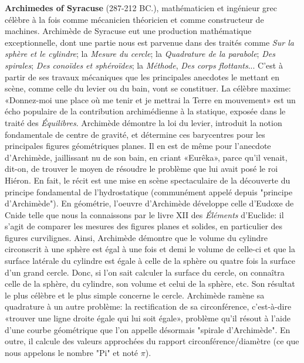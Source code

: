 \pichskip{15pt}%
\textbf{Archimedes of Syracuse} (287-212 BC.), mathématicien et ingénieur grec célèbre à la fois comme mécanicien théoricien et comme constructeur de machines. Archimède de Syracuse eut une production mathématique exceptionnelle, dont une partie nous est parvenue dans des traités comme \textit{Sur la sphère et le cylindre}; la \textit{Mesure du cercle}; la \textit{Quadrature de la parabole};\textit{ Des spirales};\textit{ Des conoïdes et sphéroïdes}; la \textit{Méthode}, \textit{Des corps flottants}... C'est à partir de ses travaux mécaniques que les principales anecdotes le mettant en scène, comme celle du levier ou du bain, vont se constituer. La célèbre maxime: «Donnez-moi une place où me tenir et je mettrai la Terre en mouvement» est un écho populaire de la contribution archimédienne à la statique, exposée dans le traité des \textit{Équilibres}. Archimède démontre la loi du levier, introduit la notion fondamentale de centre de gravité, et détermine ces barycentres pour les principales figures géométriques planes. Il en est de même pour l'anecdote d'Archimède, jaillissant nu de son bain, en criant «Eurêka», parce qu'il venait, dit-on, de trouver le moyen de résoudre le problème que lui avait posé le roi Hiéron. En fait, le récit est une mise en scène spectaculaire de la découverte du principe fondamental de l'hydrostatique (communément appelé depuis "principe d'Archimède"). En géométrie, l'oeuvre d'Archimède développe celle d'Eudoxe de Cnide telle que nous la connaissons par le livre XII des \textit{Éléments}  d'Euclide: il s'agit de comparer les mesures des figures planes et solides, en particulier des figures curvilignes. Ainsi, Archimède démontre que le volume du cylindre circonscrit à une sphère est égal à une fois et demi le volume de celle-ci et que la surface latérale du cylindre est égale à celle de la sphère ou quatre fois la surface d'un grand cercle. Donc, si l'on sait calculer la surface du cercle, on connaîtra celle de la sphère, du cylindre, son volume et celui de la sphère, etc. Son résultat le plus célèbre et le plus simple concerne le cercle. Archimède ramène sa quadrature à un autre problème: la rectification de sa circonférence, c'est-à-dire «trouver une ligne droite égale qui lui soit égale», problème qu'il résout à l'aide d'une courbe géométrique que l'on appelle désormais "spirale d'Archimède". En outre, il calcule des valeurs approchées du rapport circonférence/diamètre (ce que nous appelons le nombre "Pi" et noté $\pi$).

